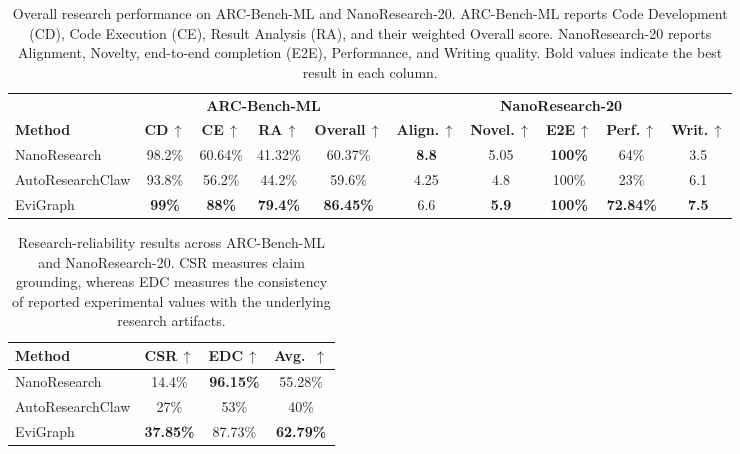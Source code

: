 \documentclass[letterpaper]{article} %
\begin{document}
\begin{table}[htp]
  \centering
  \small
  \begin{tabular}{lccccccccc}
    \toprule
    & \multicolumn{4}{c}{\textbf{ARC-Bench-ML}}
    & \multicolumn{5}{c}{\textbf{NanoResearch-20}} \\
    \cmidrule(lr){2-5}
    \cmidrule(lr){6-10}
    \textbf{Method}
      & \textbf{CD}\,$\uparrow$
      & \textbf{CE}\,$\uparrow$
      & \textbf{RA}\,$\uparrow$
      & \textbf{Overall}\,$\uparrow$
      & \textbf{Align.}\,$\uparrow$
      & \textbf{Novel.}\,$\uparrow$
      & \textbf{E2E}\,$\uparrow$
      & \textbf{Perf.}\,$\uparrow$
      & \textbf{Writ.}\,$\uparrow$ \\
    \midrule
    NanoResearch
      & 98.2\% & 60.64\% & 41.32\% & 60.37\%
      & \textbf{8.8} & 5.05 & \textbf{100\%} & 64\% & 3.5 \\
    AutoResearchClaw 
      & 93.8\% & 56.2\% & 44.2\% & 59.6\%
      & 4.25 & 4.8 & 100\% & 23\% & 6.1 \\
    \midrule
    EviGraph
      & \textbf{99\%}
      & \textbf{88\%}
      & \textbf{79.4\%}
      & \textbf{86.45\%}
      & 6.6
      & \textbf{5.9}
      & \textbf{100\%}
      & \textbf{72.84\%}
      & \textbf{7.5} \\
    \bottomrule
  \end{tabular}%
  \caption{Overall research performance on ARC-Bench-ML and NanoResearch-20. ARC-Bench-ML reports Code Development (CD), Code Execution (CE), Result Analysis (RA), and their weighted Overall score. NanoResearch-20 reports Alignment, Novelty, end-to-end completion (E2E), Performance, and Writing quality. Bold values indicate the best result in each column.}
  \label{tab:benchmark-results}
\end{table}

\begin{table}[htp]
  \centering
  \small
  \setlength{\tabcolsep}{3.5pt}
  \begin{tabular}{lccc}
    \toprule
    \textbf{Method}
      & \textbf{CSR}\,$\uparrow$
      & \textbf{EDC}\,$\uparrow$ 
      & \textbf{Avg.}\, $\uparrow$ \\
    \midrule
    NanoResearch
      & 14.4\% & \textbf{96.15\%} & 55.28\%\\
    AutoResearchClaw
      & 27\% & 53\% & 40\%\\
    \midrule
    EviGraph
      & \textbf{37.85\%} & 87.73\% & \textbf{62.79\%}\\
    \bottomrule
  \end{tabular}
  \caption{Research-reliability results across ARC-Bench-ML and  NanoResearch-20. CSR measures claim grounding, whereas EDC measures the consistency of reported experimental values with the underlying research artifacts.}
  \label{tab:reliability}
\end{table}
\end{document}
